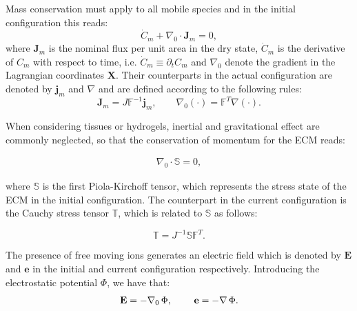 \documentclass[runningheads]{llncs}
\newcommand{\F}{\ensuremath{\mathbb{F}}}
\begin{document}
Mass conservation must apply to all mobile species and in the initial configuration this reads:
\begin{equation}
\dot{C}_m + \nabla_0 \cdot \mathbf{J}_m = 0, \label{consmass}
\end{equation}
where $\mathbf{J}_m$ is the nominal flux per unit area in the dry state, $\dot{C}_m$ is the derivative of $C_m$ with respect to time, i.e.  $\dot{C}_m\equiv\partial_t C_m$ and $\nabla_0$ denote the gradient in the Lagrangian coordinates $\mathbf{X}$. Their counterparts in the actual configuration are denoted by $\mathbf{j}_m$ and $\nabla$ and are defined according to the following rules:
\begin{equation}
\mathbf{J}_m = J \F^{-1} \mathbf{j}_m, \qquad \nabla_0 (\cdot) = \F^{T} \nabla(\cdot).
\end{equation}

When considering tissues or hydrogels, inertial and gravitational effect are commonly neglected, so that the conservation of momentum for the ECM reads:

\begin{gather}
\nabla_0 \cdot \mathbb{S}=0\label{consmom},
\end{gather}

where $\mathbb{S}$ is the first Piola-Kirchoff tensor, which represents the stress state of the ECM in the initial configuration. The counterpart in the current configuration is the Cauchy stress tensor $\mathbb{T}$, which is related to $\mathbb{S}$ as follows:

\begin{equation}
\mathbb{T} = J^{-1}\mathbb{S}\F^T.
\end{equation}

The presence of free moving ions generates an electric field which is denoted by $\mathbf{E}$ and $\mathbf{e}$ in the initial and current configuration respectively. Introducing the electrostatic potential $\Phi$, we have that:
\begin{equation}
\mathbf{E}= -\nabla_0 \, \Phi, \hspace{8mm} \mathbf{e}= - \nabla \, \Phi.
\end{equation}
\end{document}
